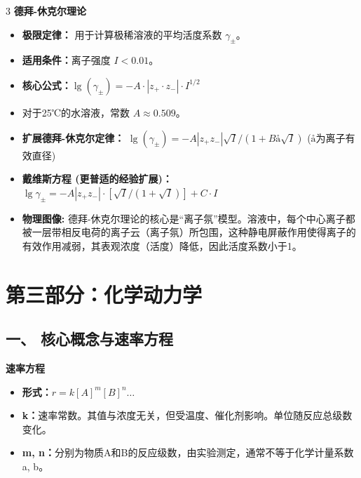 \documentclass[a4paper,6pt]{article} %
\begin{document}
\begin{multicols}{3}
\textbf{德拜-休克尔理论}
\begin{itemize}
    \item \textbf{极限定律：} 用于计算极稀溶液的平均活度系数 $\gamma_\pm$。
    \item \textbf{适用条件：}离子强度 $I < 0.01$。
    \item \textbf{核心公式：}$\lg(\gamma_\pm) = -A \cdot |z_+ \cdot z_-| \cdot I^{1/2}$
    \item 对于25℃的水溶液，常数 $A \approx 0.509$。
    \item \textbf{扩展德拜-休克尔定律：} $\lg(\gamma_\pm) = -A|z_+z_-|\sqrt{I} / (1 + Bå\sqrt{I})$ ($å$为离子有效直径)
    \item \textbf{戴维斯方程 (更普适的经验扩展)：} $\lg\gamma_\pm = -A|z_+z_-|\cdot[\sqrt{I} / (1+\sqrt{I})] + C\cdot I$
    \item \textbf{物理图像:} 德拜-休克尔理论的核心是“离子氛”模型。溶液中，每个中心离子都被一层带相反电荷的离子云（离子氛）所包围，这种静电屏蔽作用使得离子的有效作用减弱，其表观浓度（活度）降低，因此活度系数小于1。
\end{itemize}

\section*{第三部分：化学动力学}
\subsection*{一、 核心概念与速率方程}

\textbf{速率方程}
\begin{itemize}
    \item \textbf{形式：}$r = k [A]^m [B]^n \dots$
    \item \textbf{k：}速率常数。其值与浓度无关，但受温度、催化剂影响。单位随反应总级数变化。
    \item \textbf{m, n：}分别为物质A和B的反应级数，由实验测定，通常不等于化学计量系数 a, b。
\end{itemize}


\end{multicols}
\end{document}
